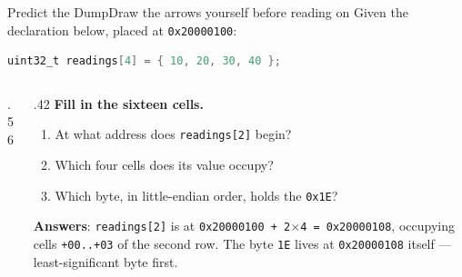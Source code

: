 \documentclass[9pt,aspectratio=169,xcolor=table]{beamer}
\begin{document}
\begin{frame}[fragile]{Predict the Dump}{Draw the arrows yourself before reading on}
    \leavevmode
    Given the declaration below, placed at \texttt{0x20000100}:

    \vspace{2mm}
    \begin{center}
    \begin{minipage}{.6\textwidth}
\begin{lstlisting}[language=C, basicstyle=\ttfamily\footnotesize]
uint32_t readings[4] = { 10, 20, 30, 40 };
\end{lstlisting}
    \end{minipage}
    \end{center}

    \vspace{1mm}
    \begin{columns}[c]
    \begin{column}{.56\textwidth}
        \begin{center}
        \end{center}
    \end{column}
    \begin{column}{.42\textwidth}
        \textbf{Fill in the sixteen cells.}
        {\small
        \begin{enumerate}\itemsep1pt
            \item At what address does \texttt{readings[2]} begin?
            \item Which four cells does its value occupy?
            \item Which byte, in little-endian order, holds the \texttt{0x1E}?
        \end{enumerate}}
        \vspace{2mm}
        {\small \textbf{Answers}: \texttt{readings[2]} is at \texttt{0x20000100 + 2$\times$4 = 0x20000108}, occupying cells \texttt{+00..+03} of the second row. The byte \texttt{1E} lives at \texttt{0x20000108} itself --- least-significant byte first.}
    \end{column}
    \end{columns}
\end{frame}
\end{document}
